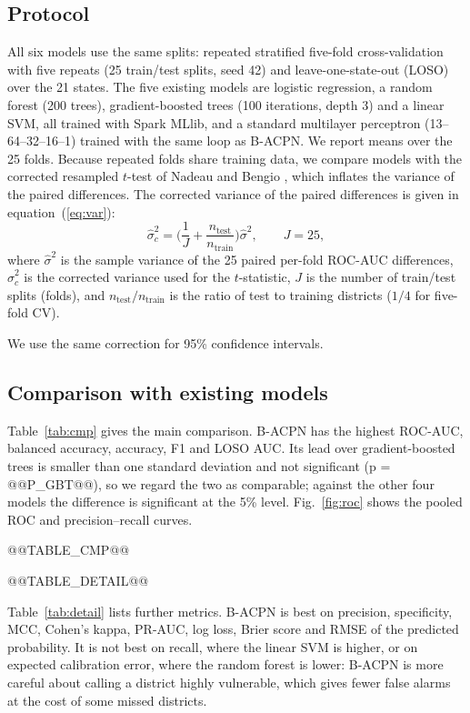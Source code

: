 \documentclass[conference]{IEEEtran}
\begin{document}
\subsection{Protocol}
All six models use the same splits: repeated stratified five-fold cross-validation with five repeats (25 train/test splits, seed 42) and leave-one-state-out (LOSO) over the 21 states. The five existing models are logistic regression, a random forest (200 trees), gradient-boosted trees (100 iterations, depth 3) and a linear SVM, all trained with Spark MLlib, and a standard multilayer perceptron (13--64--32--16--1) trained with the same loop as B-ACPN. We report means over the 25 folds. Because repeated folds share training data, we compare models with the corrected resampled $t$-test of Nadeau and Bengio \cite{nadeau2003}, which inflates the variance of the paired differences. The corrected variance of the paired differences is given in equation~(\ref{eq:var}):
\begin{equation}\label{eq:var}
\hat\sigma^2_{c} = \Big(\frac{1}{J} + \frac{n_{\text{test}}}{n_{\text{train}}}\Big)\hat\sigma^2,\qquad J = 25,
\end{equation}
\noindent where $\hat\sigma^2$ is the sample variance of the 25 paired per-fold ROC-AUC differences, $\hat\sigma^2_{c}$ is the corrected variance used for the $t$-statistic, $J$ is the number of train/test splits (folds), and $n_{\text{test}}/n_{\text{train}}$ is the ratio of test to training districts ($1/4$ for five-fold CV).


We use the same correction for 95\% confidence intervals.

\subsection{Comparison with existing models}
Table~\ref{tab:cmp} gives the main comparison. B-ACPN has the highest ROC-AUC, balanced accuracy, accuracy, F1 and LOSO AUC. Its lead over gradient-boosted trees is smaller than one standard deviation and not significant (p = @@P_GBT@@), so we regard the two as comparable; against the other four models the difference is significant at the 5\% level. Fig.~\ref{fig:roc} shows the pooled ROC and precision--recall curves.

@@TABLE_CMP@@

@@TABLE_DETAIL@@

Table~\ref{tab:detail} lists further metrics. B-ACPN is best on precision, specificity, MCC, Cohen's kappa, PR-AUC, log loss, Brier score and RMSE of the predicted probability. It is not best on recall, where the linear SVM is higher, or on expected calibration error, where the random forest is lower: B-ACPN is more careful about calling a district highly vulnerable, which gives fewer false alarms at the cost of some missed districts.
\end{document}
